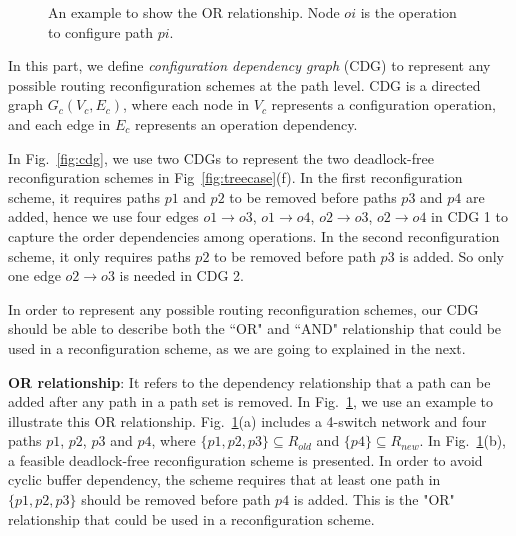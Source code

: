 \begin{figure}[t]
	\centering
	
	
	
	\caption{An example to show the OR relationship. Node $oi$ is the operation to configure path $pi$.}\label{fig:orrelationship}
	\vspace{-0.2in}
\end{figure}

In this part, we define \textit{configuration dependency graph} (CDG) to represent any possible routing reconfiguration schemes at the path level. CDG is a directed graph $G_c(V_c,E_c)$, where each node in $V_c$ represents a configuration operation, and each edge in $E_c$ represents an operation dependency. 

In Fig.~\ref{fig:cdg},  we use two CDGs to represent the two deadlock-free reconfiguration schemes in Fig~\ref{fig:treecase}(f). In the first reconfiguration scheme, it requires paths $p1$ and $p2$ to be removed before paths $p3$ and $p4$ are added, hence we use four edges $o1\rightarrow o3$, $o1\rightarrow o4$, $o2\rightarrow o3$, $o2 \rightarrow o4$ in CDG 1 to capture the order dependencies among operations. In the second reconfiguration scheme, it only requires paths $p2$ to be removed before path $p3$ is added. So only one edge $ o2 \rightarrow o3$ is needed in CDG 2.
 


In order to represent any possible routing reconfiguration schemes, our CDG should be able to describe both the ``OR" and ``AND" relationship that could be used in a reconfiguration scheme, as we are going to explained in the next.

\textbf{OR relationship}: It refers to the dependency relationship that a path can be added after any path in a path set is removed. In Fig.~\ref{fig:orrelationship}, we use an example to illustrate this OR relationship. Fig.~\ref{fig:orrelationship}(a) includes a 4-switch network and four paths $p1$, $p2$, $p3$ and $p4$, where $\{p1, p2, p3\}\subseteq 
R_{old}$ and $\{p4\}\subseteq R_{new}$. In Fig.~\ref{fig:orrelationship}(b), a feasible deadlock-free reconfiguration scheme is presented. In order to avoid cyclic buffer dependency, the scheme requires that at least one path in $\{p1, p2, p3\}$ should be removed before path $p4$ is added. This is the "OR" relationship that could be used in a reconfiguration scheme.

